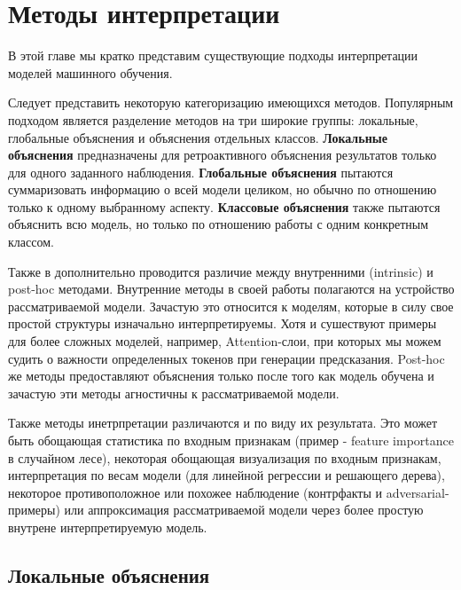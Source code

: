 \chapter{Методы интерпретации}

В этой главе мы кратко представим существующие подходы интерпретации моделей машинного обучения.

Следует представить некоторую категоризацию имеющихся методов. Популярным подходом является разделение методов на три широкие группы: локальные, глобальные объяснения и объяснения отдельных классов. \textbf{Локальные объяснения} предназначены для ретроактивного объяснения результатов только для одного заданного наблюдения. \textbf{Глобальные объяснения} пытаются суммаризовать информацию о всей модели целиком, но обычно по отношению только к одному выбранному аспекту. \textbf{Классовые объяснения} также пытаются объяснить всю модель, но только по отношению работы с одним конкретным классом.

Также в \cite{madsenPosthocInterpretabilityNeural2021} дополнительно проводится различие между внутренними (intrinsic) и post-hoc методами. Внутренние методы в своей работы полагаются на устройство рассматриваемой модели. Зачастую это относится к моделям, которые в силу свое простой структуры изначально интерпретируемы. Хотя и сушествуют примеры для более сложных моделей, например, Attention-слои, при которых мы можем судить о важности определенных токенов при генерации предсказания.
Post-hoc же методы предоставляют объяснения только после того как модель обучена и зачастую эти методы агностичны к рассматриваемой модели.

Также методы инетрпретации различаются и по виду их результата. Это может быть обощающая статистика по входным признакам (пример - feature importance в случайном лесе), некоторая обощающая визуализация по входным признакам, интерпретация по весам модели (для линейной регрессии и решающего дерева), некоторое противоположное или похожее наблюдение (контрфакты и adversarial-примеры) или аппроксимация рассматриваемой модели через более простую внутрене интерпретируемую модель.



\vspace{15mm}
\section{Локальные объяснения}

